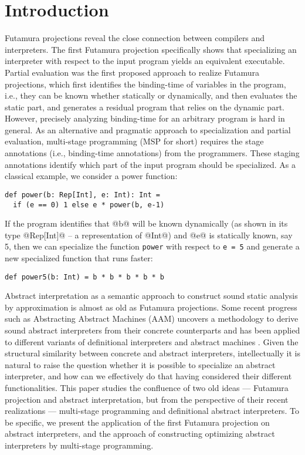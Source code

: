 \section{Introduction}

Futamura projections \cite{Futamura1999, futamura1971partial} reveal the close
connection between compilers and interpreters. The first Futamura projection
specifically shows that specializing an interpreter with respect to the input
program yields an equivalent executable. Partial evaluation
\cite{DBLP:books/daglib/0072559} was the first proposed approach to realize
Futamura projections, which first identifies the binding-time of variables in
the program, i.e., they can be known whether statically or dynamically, and then
evaluates the static part, and generates a residual program that relies on the
dynamic part. However, precisely analyzing binding-time for an arbitrary program
is hard in general. As an alternative and pragmatic approach to specialization
and partial evaluation, multi-stage programming (MSP for short)
\cite{taha1999multi, DBLP:conf/pepm/TahaS97} requires the stage annotations
(i.e., binding-time annotations) from the programmers. These staging annotations
identify which part of the input program should be specialized. As a classical
example, we consider a power function:

\begin{lstlisting}
def power(b: Rep[Int], e: Int): Int = 
  if (e == 0) 1 else e * power(b, e-1)
\end{lstlisting}

If the program identifies that @b@ will be known dynamically (as shown in its
type @Rep[Int]@ -- a representation of @Int@) and @e@ is statically known, say
5, then we can specialize the function \texttt{power} with respect to \texttt{e
= 5} and generate a new specialized function that runs faster:

\begin{lstlisting}
def power5(b: Int) = b * b * b * b * b
\end{lstlisting}

Abstract interpretation \cite{DBLP:conf/popl/CousotC77} as a semantic approach
to construct sound static analysis by approximation is almost as old as Futamura
projections. Some recent progress such as Abstracting Abstract Machines (AAM)
uncovers a methodology to derive sound abstract interpreters from their concrete
counterparts and has been applied to different variants of definitional
interpreters and abstract machines \cite{DBLP:journals/jfp/HornM12,
DBLP:conf/icfp/HornM10, DBLP:journals/pacmpl/DaraisLNH17}. Given the structural
similarity between concrete and abstract interpreters, intellectually it is
natural to raise the question whether it is possible to specialize an abstract
interpreter, and how can we effectively do that having considered their
different functionalities. This paper studies the confluence of two old ideas
--- Futamura projection and abstract interpretation, but from the perspective of
their recent realizations --- multi-stage programming and definitional abstract
interpreters. To be specific, we present the application of the first Futamura
projection on abstract interpreters, and the approach of constructing optimizing
abstract interpreters by multi-stage programming.

